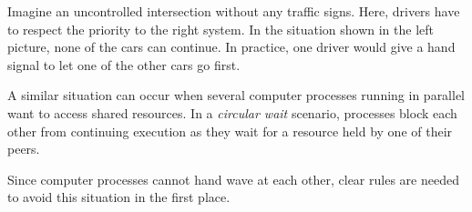 
Imagine an uncontrolled intersection without any traffic signs. Here, drivers have to respect the priority to the right system. In the situation shown in the left picture, none of the cars can continue. In practice, one driver would give a hand signal to let one of the other cars go first.

A similar situation can occur when several computer processes running in parallel want to access shared resources. In a \emph{circular wait} scenario, processes block each other from continuing execution as they wait for a resource held by one of their peers.

Since computer processes cannot hand wave at each other, clear rules are needed to avoid this situation in the first place.

